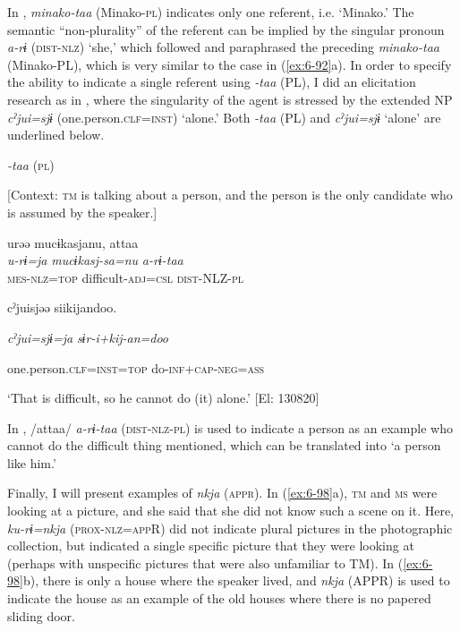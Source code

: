 \begin{table}
In , \textit{minako-taa} (Minako-\textsc{pl}) indicates only one referent, i.e. ‘Minako.’ The semantic “non-plurality” of the referent can be implied by the singular pronoun \textit{a-rɨ} (\textsc{dist}-\textsc{nlz}) ‘she,’ which followed and paraphrased the preceding \textit{minako-taa} (Minako-PL), which is very similar to the case in (\ref{ex:6-92}a). In order to specify the ability to indicate a single referent using \textit{-taa} (PL), I did an elicitation research as in , where the singularity of the agent is stressed by the extended NP \textit{cˀjui=sjɨ} (one.person.\textsc{clf}=\textsc{inst}) ‘alone.’ Both \textit{-taa} (PL) and \textit{cˀjui=sjɨ} ‘alone’ are underlined below.

\ea\label{ex:6-97}
  \textit{-taa} (\textsc{pl})

  [Context: \textsc{tm} is talking about a person, and the person is the only candidate who is assumed by the speaker.]

{\TM}
\glll urəə  mucɨkasjanu,  attaa\\
\textit{u-rɨ=ja}  \textit{mucɨkasj-sa=nu}  \textit{a-rɨ-taa}\\

    \textsc{mes}-\textsc{nlz}=\textsc{top}  difficult-\textsc{adj}=\textsc{csl}  \textsc{dist}-NLZ-\textsc{pl}

    cˀjuisjəə  siikijandoo.

    \textit{cˀjui=sjɨ=ja}  \textit{sɨr-i+kij-an=doo}

    one.person.\textsc{clf}=\textsc{inst}=\textsc{top}  do-\textsc{inf}+\textsc{cap}-\textsc{neg}=\textsc{ass}

\glt    ‘That is difficult, so he cannot do (it) alone.’ [El: 130820]

In , /attaa/ \textit{a-rɨ-taa} (\textsc{dist}-\textsc{nlz}-\textsc{pl}) is used to indicate a person as an example who cannot do the difficult thing mentioned, which can be translated into ‘a person like him.’

  Finally, I will present examples of \textit{nkja} (\textsc{appr}). In (\ref{ex:6-98}a), \textsc{tm} and \textsc{ms} were looking at a picture, and she said that she did not know such a scene on it. Here, \textit{ku-rɨ=nkja} (\textsc{prox}-\textsc{nlz}=\textsc{app}R) did not indicate plural pictures in the photographic collection, but indicated a single specific picture that they were looking at (perhaps with unspecific pictures that were also unfamiliar to TM). In (\ref{ex:6-98}b), there is only a house where the speaker lived, and \textit{nkja} (APPR) is used to indicate the house as an example of the old houses where there is no papered sliding door.


\end{table}
